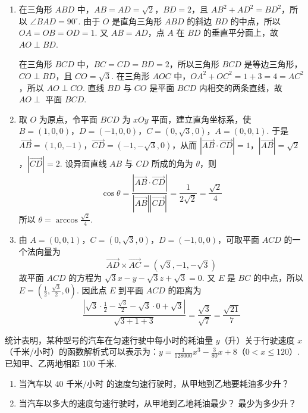 \begin{solution}
\begin{enumerate}
\item 在三角形 \(ABD\) 中，\(AB=AD=\sqrt{2}\)，\(BD=2\)，且 \(AB^{2}+AD^{2}=BD^{2}\)，所以 \(\angle BAD=90^{\circ}\). 由于 \(O\) 是直角三角形 \(ABD\) 的斜边 \(BD\) 的中点，所以 \(OA=OB=OD=1\). 又 \(AB=AD\)，点 \(A\) 在 \(BD\) 的垂直平分面上，故 \(AO\perp BD\).

在三角形 \(BCD\) 中，\(BC=CD=BD=2\)，所以三角形 \(BCD\) 是等边三角形，\(CO\perp BD\)，且 \(CO=\sqrt{3}\). 在三角形 \(AOC\) 中，\(OA^{2}+OC^{2}=1+3=4=AC^{2}\)，所以 \(AO\perp CO\). 直线 \(BD\) 与 \(CO\) 是平面 \(BCD\) 内相交的两条直线，故 \(AO\perp\) 平面 \(BCD\).
\item 取 \(O\) 为原点，令平面 \(BCD\) 为 \(xOy\) 平面，建立直角坐标系，使 \(B=(1,0,0)\)，\(D=(-1,0,0)\)，\(C=(0,\sqrt{3},0)\)，\(A=(0,0,1)\). 于是 \(\overrightarrow{AB}=(1,0,-1)\)，\(\overrightarrow{CD}=(-1,-\sqrt{3},0)\)，从而 \(\left|\overrightarrow{AB}\cdot\overrightarrow{CD}\right|=1\)，\(\left|\overrightarrow{AB}\right|=\sqrt{2}\)，\(\left|\overrightarrow{CD}\right|=2\).
设异面直线 \(AB\) 与 \(CD\) 所成的角为 \(\theta\)，则
\[
\cos\theta=\frac{\left|\overrightarrow{AB}\cdot\overrightarrow{CD}\right|}{\left|\overrightarrow{AB}\right|\left|\overrightarrow{CD}\right|}=\frac{1}{2\sqrt{2}}=\frac{\sqrt{2}}{4}
\]
所以 \(\theta=\arccos\frac{\sqrt{2}}{4}\).
\item 由 \(A=(0,0,1)\)，\(C=(0,\sqrt{3},0)\)，\(D=(-1,0,0)\)，可取平面 \(ACD\) 的一个法向量为
\[
\overrightarrow{AD}\times\overrightarrow{AC}=(\sqrt{3},-1,-\sqrt{3})
\]
故平面 \(ACD\) 的方程为 \(\sqrt{3}x-y-\sqrt{3}z+\sqrt{3}=0\). 又 \(E\) 是 \(BC\) 的中点，所以 \(E=\left(\frac{1}{2},\frac{\sqrt{3}}{2},0\right)\). 因此点 \(E\) 到平面 \(ACD\) 的距离为
\[
\frac{\left|\sqrt{3}\cdot\frac{1}{2}-\frac{\sqrt{3}}{2}-\sqrt{3}\cdot0+\sqrt{3}\right|}{\sqrt{3+1+3}}=\frac{\sqrt{3}}{\sqrt{7}}=\frac{\sqrt{21}}{7}
\]
\end{enumerate}
\end{solution}

\begin{problem}
统计表明，某种型号的汽车在匀速行驶中每小时的耗油量 \(y\)（升）关于行驶速度 \(x\)（千米/小时）的函数解析式可以表示为：\(y=\frac{1}{128000}x^3-\frac{3}{80}x+8\)（\(0<x\leqslant120\)）. 已知甲、乙两地相距 \(100\text{ 千米}\).

\begin{enumerate}
\item 当汽车以 \(40\text{ 千米/小时}\) 的速度匀速行驶时，从甲地到乙地要耗油多少升？
\item 当汽车以多大的速度匀速行驶时，从甲地到乙地耗油最少？ 最少为多少升？
\end{enumerate}
\end{problem}

